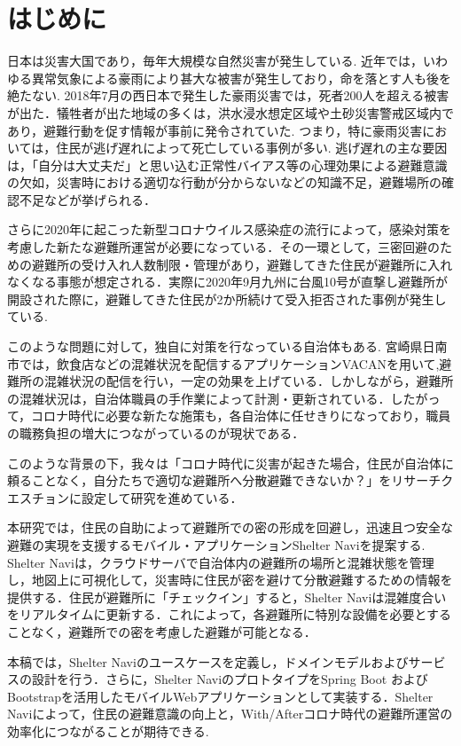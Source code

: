 \documentclass[technicalreport,dvipdfmx]{ieicej}
\begin{document}
\section{はじめに}
日本は災害大国であり，毎年大規模な自然災害が発生している. 近年では，いわゆる異常気象による豪雨により甚大な被害が発生しており，命を落とす人も後を絶たない. 2018年7月の西日本で発生した豪雨災害では，死者200人を超える被害が出た\cite{1}．犠牲者が出た地域の多くは，洪水浸水想定区域や土砂災害警戒区域内であり，避難行動を促す情報が事前に発令されていた. つまり，特に豪雨災害においては，住民が逃げ遅れによって死亡している事例が多い. 逃げ遅れの主な要因は，「自分は大丈夫だ」と思い込む正常性バイアス等の心理効果による避難意識の欠如\cite{2,3,4}，災害時における適切な行動が分からないなどの知識不足，避難場所の確認不足などが挙げられる\cite{5}．

さらに2020年に起こった新型コロナウイルス感染症の流行によって，感染対策を考慮した新たな避難所運営が必要になっている\cite{6}．その一環として，三密回避のための避難所の受け入れ人数制限・管理があり，避難してきた住民が避難所に入れなくなる事態が想定される．実際に2020年9月九州に台風10号が直撃し避難所が開設された際に，避難してきた住民が2か所続けて受入拒否された事例が発生している\cite{7}. 

このような問題に対して，独自に対策を行なっている自治体もある. 宮崎県日南市では，飲食店などの混雑状況を配信するアプリケーションVACANを用いて,避難所の混雑状況の配信を行い，一定の効果を上げている\cite{8}．しかしながら，避難所の混雑状況は，自治体職員の手作業によって計測・更新されている．したがって，コロナ時代に必要な新たな施策も，各自治体に任せきりになっており，職員の職務負担の増大につながっているのが現状である．

このような背景の下，我々は「コロナ時代に災害が起きた場合，住民が自治体に頼ることなく，自分たちで適切な避難所へ分散避難できないか？」をリサーチクエスチョンに設定して研究を進めている．

本研究では，住民の自助によって避難所での密の形成を回避し，迅速且つ安全な避難の実現を支援するモバイル・アプリケーションShelter Naviを提案する. Shelter Naviは，クラウドサーバで自治体内の避難所の場所と混雑状態を管理し，地図上に可視化して，災害時に住民が密を避けて分散避難するための情報を提供する．住民が避難所に「チェックイン」すると，Shelter Naviは混雑度合いをリアルタイムに更新する．これによって，各避難所に特別な設備を必要とすることなく，避難所での密を考慮した避難が可能となる．

本稿では，Shelter Naviのユースケースを定義し，ドメインモデルおよびサービスの設計を行う．さらに，Shelter NaviのプロトタイプをSpring Boot \cite{9}およびBootstrapを活用したモバイルWebアプリケーションとして実装する．Shelter Naviによって，住民の避難意識の向上と，With/Afterコロナ時代の避難所運営の効率化につながることが期待できる.
\end{document}
